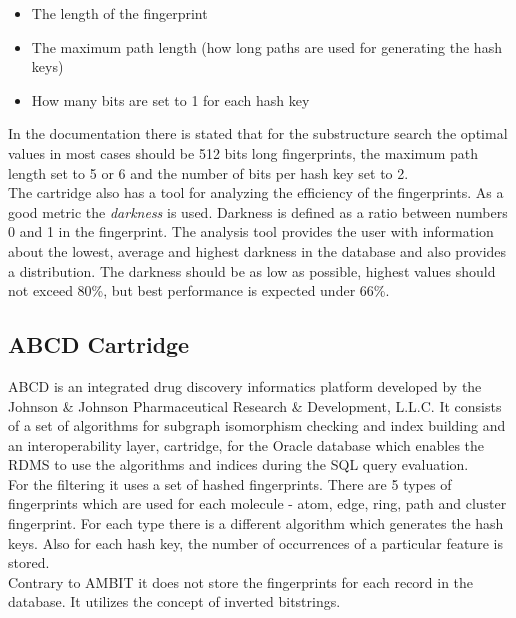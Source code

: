 \begin{itemize}
	\item The length of the fingerprint
	\item The maximum path length (how long paths are used for generating the hash keys)
	\item How many bits are set to 1 for each hash key
\end{itemize}

In the documentation there is stated that for the substructure search the optimal values in most cases should be 512 bits long fingerprints, the maximum path length set to 5 or 6 and the number of bits per hash key set to 2.\\

The cartridge also has a tool for analyzing the efficiency of the fingerprints. As a good metric the \textit{darkness} is used. Darkness is defined as a ratio between numbers 0 and 1 in the fingerprint. The analysis tool provides the user with information about the lowest, average and highest darkness in the database and also provides a distribution. The darkness should be as low as possible, highest values should not exceed 80\%, but best performance is expected under 66\%.

\subsection{ABCD Cartridge}

ABCD is an integrated drug discovery informatics platform developed by the Johnson \& Johnson Pharmaceutical Research \& Development, L.L.C. It consists of a set of algorithms for subgraph isomorphism checking and index building and an interoperability layer, cartridge, for the Oracle database which enables the RDMS to use the algorithms and indices during the SQL query evaluation.\\

For the filtering it uses a set of hashed fingerprints. There are 5 types of fingerprints which are used for each molecule - atom, edge, ring, path and cluster fingerprint. For each type there is a different algorithm which generates the hash keys. Also for each hash key, the number of occurrences of a particular feature is stored.\\

Contrary to AMBIT it does not store the fingerprints for each record in the database. It utilizes the concept of inverted bitstrings.\\

